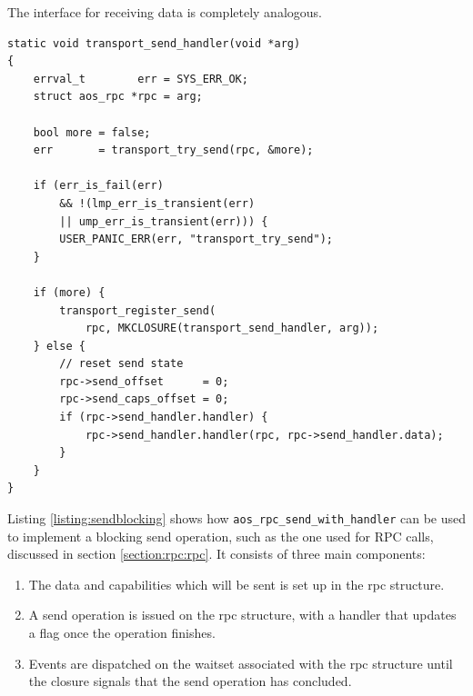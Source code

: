 The interface for receiving data is completely analogous.

\begin{lstlisting}[caption={Send handler registered on waitset},label={listing:sendhandler}]
static void transport_send_handler(void *arg)
{
    errval_t        err = SYS_ERR_OK;
    struct aos_rpc *rpc = arg;

    bool more = false;
    err       = transport_try_send(rpc, &more);

    if (err_is_fail(err) 
        && !(lmp_err_is_transient(err) 
        || ump_err_is_transient(err))) {
        USER_PANIC_ERR(err, "transport_try_send");
    }

    if (more) {
        transport_register_send(
            rpc, MKCLOSURE(transport_send_handler, arg));
    } else {
        // reset send state
        rpc->send_offset      = 0;
        rpc->send_caps_offset = 0;
        if (rpc->send_handler.handler) {
            rpc->send_handler.handler(rpc, rpc->send_handler.data);
        }
    }
}
\end{lstlisting}

Listing \ref{listing:sendblocking} shows how \texttt{aos\_rpc\_send\_with\_handler} can be used to implement a blocking send operation, such as the one used for RPC calls, discussed in section \ref{section:rpc:rpc}. It consists of three main components:
\begin{enumerate}
    \item The data and capabilities which will be sent is set up in the rpc structure.
    \item A send operation is issued on the rpc structure, with a handler that updates a flag once the operation finishes.
    \item Events are dispatched on the waitset associated with the rpc structure until the closure signals that the send operation has concluded.
\end{enumerate}

